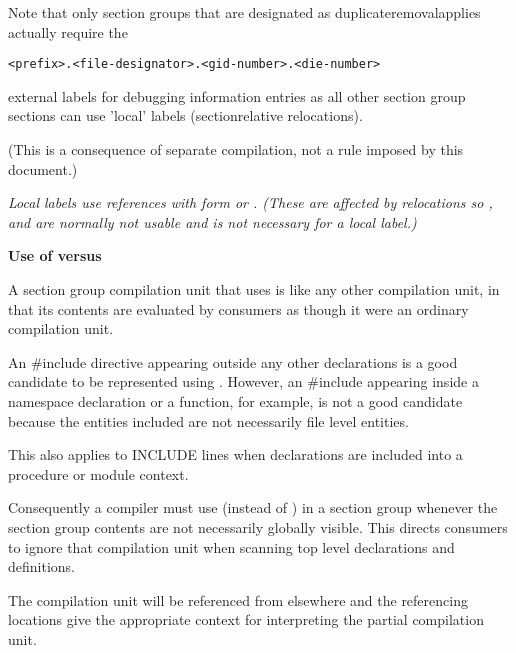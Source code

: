 Note that only section groups that are designated as
duplicate\dash removal\dash applies actually require the
\begin{alltt}
    <prefix>.<file-designator>.<gid-number>.<die-number>
\end{alltt}
external labels for debugging information entries as all other
section group sections can use 'local' labels 
(section\dash relative
relocations).

(This is a consequence of separate compilation, not a rule
imposed by this document.)

\textit{Local labels use references with form 
or 
. 
(These are affected by relocations
so 
, 
 and 
 are
normally not usable and 
 is not necessary
for a local label.)}

\textbf{Use of  versus 
}

A section group compilation unit that uses 
is like any other compilation unit, in that its contents
are evaluated by consumers as though it were an ordinary
compilation unit.

An \#include directive appearing outside any other
declarations is a good candidate to be represented using
. 
However, an \#include appearing inside
a  namespace declaration or a function, for example, is
not a good candidate because the entities included are not
necessarily file level entities.

This also applies to  INCLUDE lines when declarations
are included into a procedure or module context.

Consequently a compiler must use  (instead
of ) in a section group whenever the section
group contents are not necessarily globally visible. This
directs consumers to ignore that compilation unit when scanning
top level declarations and definitions.

The  compilation unit will be referenced
from elsewhere and the referencing locations give the
appropriate context for interpreting the partial compilation
unit.

